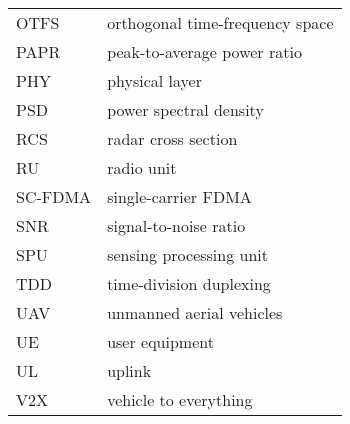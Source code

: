 \begin{table}[H]
\begin{tabular}{ll}
		OTFS & orthogonal time-frequency space \\[2px]
		PAPR & peak-to-average power ratio \\[2px]
		PHY & physical layer \\[2px]
		PSD & power spectral density  \\[2px]
		RCS & radar cross section \\[2px]
		RU & radio unit \\[2px]
		SC-FDMA & single-carrier FDMA \\[2px]
		SNR & signal-to-noise ratio \\[2px]
		SPU & sensing processing unit \\[2px]
		TDD & time-division duplexing \\[2px]
		UAV & unmanned aerial vehicles \\[2px]
		UE & user equipment \\[2px]
		UL & uplink \\[2px]
		V2X & vehicle to everything \\[2px]
		
		
	\end{tabular}
\end{table}